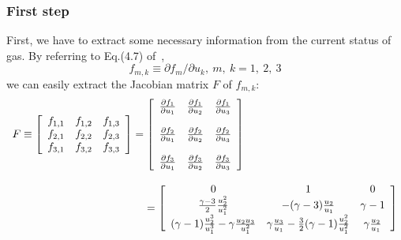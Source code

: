 \documentclass[a4paper,12pt]{article}
\begin{document}
\subsubsection{First step}
 \label{subsubsec:first_step}
First, we have to extract some necessary information from the current status 
of gas. By referring to Eq.(4.7) of~\cite{CESE_Shin_Chung_Chang_1995}, 
\begin{equation}
f_{m,k}\equiv\partial f_{m}/\partial u_{k},~m,~k = 1,~2,~3
\end{equation}
we can easily extract the Jacobian matrix $F$ of $f_{m,k}$:
\begin{equation}
\begin{array}{l}
F\equiv\left[
       \begin{array}{ccc}
       f_{1,1} & f_{1,2} & f_{1,3} \\
       f_{2,1} & f_{2,2} & f_{2,3} \\
       f_{3,1} & f_{3,2} & f_{3,3}
       \end{array}
       \right] 
       =
       \left[
       \begin{array}{ccc}
       \frac{\partial f_{1}}{\partial u_{1}} & \frac{\partial f_{1}}{\partial 
       u_{2}} & \frac{\partial f_{1}}{\partial u_{3}} \\ \\
       \frac{\partial f_{2}}{\partial u_{1}} & \frac{\partial f_{2}}{\partial 
       u_{2}} & \frac{\partial f_{2}}{\partial u_{3}} \\ \\
       \frac{\partial f_{3}}{\partial u_{1}} & \frac{\partial f_{3}}{\partial 
       u_{2}} & \frac{\partial f_{3}}{\partial u_{3}}
       \end{array}
       \right] \\ \\
       \hspace{44mm}=
       \left[
       \begin{array}{ccc}
       0 & 1 & 0 \\
       \frac{\gamma -3}{2}\frac{u^{2}_{2}}{u^{2}_{1}} & -(\gamma -3)\frac{u_{2}}
       {u_{1}} & \gamma -1 \\
       (\gamma -1)\frac{u^{3}_{2}}{u^{3}_{1}}-\gamma\frac{u_{2}u_{3}}{u^{2}_{1}} 
       & \gamma\frac{u_{3}}{u_{1}}-\frac{3}{2}(\gamma -1)\frac{u^{2}_{2}}{u^{2}_{1}} 
       & \gamma\frac{u_{2}}{u_{1}}
       \end{array}
       \right]
\end{array}
\end{equation}
\end{document}
